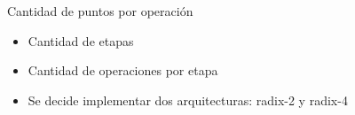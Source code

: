 \begin{frame}{Cantidad de puntos por operación}
  \begin{itemize}
    \item<1-> Cantidad de etapas
    \item<2-> Cantidad de operaciones por etapa
    \vfill
    
    
    \vfill

  \item<4-> Se decide implementar dos arquitecturas: radix-2 y radix-4
  \end{itemize}
\end{frame}


